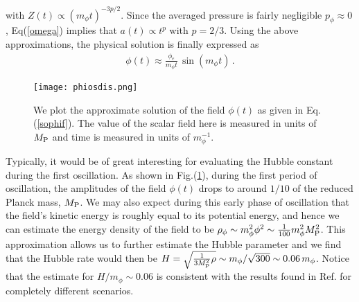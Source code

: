 \documentclass[aps,prd,amsmath,amssymb,preprintnumbers,onecolumn,11pt,nofootinbib]{revtex4}
\begin{document}
with $Z(t) \propto (m_{\phi}t)^{-3p/2}$. Since the averaged pressure is fairly negligible $p_{\phi} \approx 0$, Eq(\ref{omega}) implies that $a(t) \propto t^{p}$ with $p=2/3$. Using the above approximations, the physical solution is finally expressed as
\begin{eqnarray} \label{sophif}
\phi(t) \approx \frac{\phi_{e}}{m_{\phi}t}\,\sin(m_{\phi}t)\,.
\end{eqnarray}
\begin{figure}[t]
\begin{center}		
\texttt{[image: phiosdis.png]}
\caption{We plot the approximate solution of the field $\phi(t)$ as given in Eq.(\ref{sophif}). The value of the scalar field here is measured in units of $M_{\rm P}$ and time is measured in units of $m^{-1}_{\phi}$. \label{plotphi}}
\end{center}
\end{figure}
Typically, it would be of great interesting for evaluating the Hubble constant during the first oscillation. As shown in Fig.(\ref{plotphi}), during the first period of oscillation, the amplitudes of the field $\phi(t)$ drops to around $1/10$ of the reduced Planck mass, $M_{\rm P}$. We may also expect during this early phase of oscillation that the field's kinetic energy is roughly equal to its potential energy, and hence we can estimate the energy density of the field to be $\rho_{\phi} \sim m^{2}_{\phi}\phi^{2}\sim \frac{1}{100}m^{2}_{\phi}M^{2}_{\rm P}$. This approximation allows us to further estimate the Hubble parameter and we find that the Hubble rate would then be $H=\sqrt{\frac{1}{3M^{2}_{\rm P}}\rho}\sim m_{\phi}/\sqrt{300} \sim 0.06\,m_{\phi}$. Notice that the estimate for $H/m_{\phi} \sim 0.06$ is consistent with the results found in Ref.\cite{DeCross:2015uza,Channuie:2016xmq} for completely different scenarios.
\end{document}
